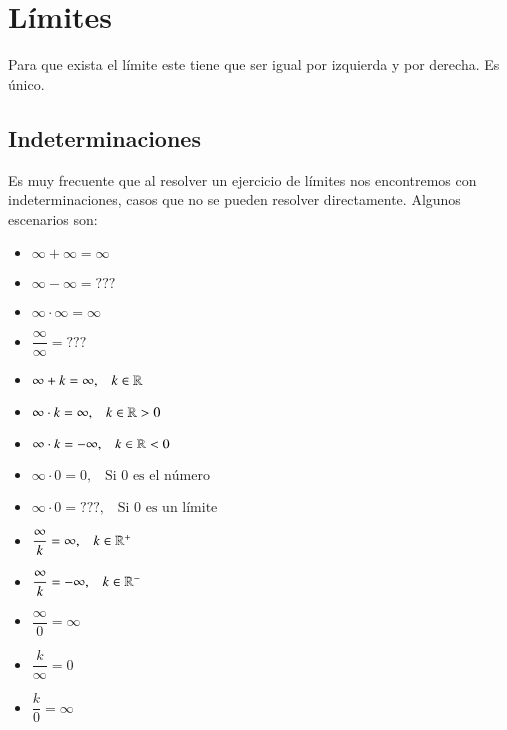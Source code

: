 \section{Límites}

Para que exista el límite este tiene que ser igual por izquierda y por derecha. Es único. 

\subsection*{Indeterminaciones}

Es muy frecuente que al resolver un ejercicio de límites nos encontremos con indeterminaciones, casos que no se pueden resolver directamente. Algunos escenarios son:

\begin{multicols}{2}
\begin{itemize}
\item $\infty + \infty = \infty$

\item $\infty - \infty = ???$

\item $\infty \cdot \infty = \infty$

\item $\dfrac{\infty}{\infty} = ???$

\item $\infty + k = \infty, \;\;\;k\in\mathbb{R}$

\item $\infty \cdot k = \infty, \;\;\;k\in\mathbb{R}>0$

\item $\infty \cdot k = -\infty, \;\;\;k\in\mathbb{R}<0$

\item $\infty \cdot 0 = 0, \;\;\;\text{Si 0 es el número}$

\item $\infty \cdot 0 = ???, \;\;\;\text{Si 0 es un límite}$

\item $\dfrac{\infty}{k}= \infty, \;\;\;k\in\mathbb{R}^+$

\item $\dfrac{\infty }{k} = -\infty, \;\;\;k\in\mathbb{R}^-$

\item $\dfrac{\infty }{0} = \infty$

\item $\dfrac{k}{\infty} = 0$

\item $\dfrac{k}{0} = \infty$


\end{itemize}
\end{multicols}
